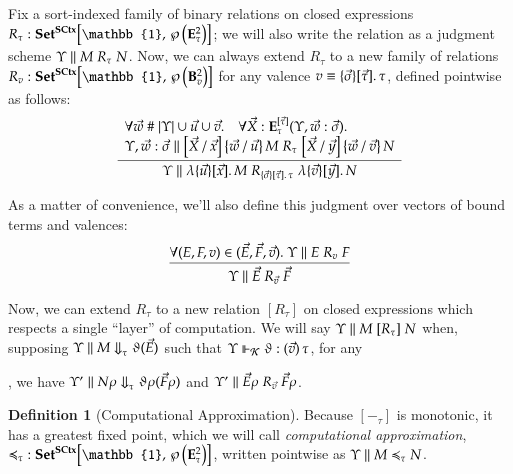 \documentclass[11pt]{article}
\theoremstyle{definition}
\newtheorem{definition}[thm]{Definition}
\theoremstyle{remark}
\numberwithin{equation}{section}
\def\IModeColorName{MidnightBlue}
\def\OModeColorName{Maroon}
\def\IModeColorName{Black}
\def\OModeColorName{Black}
\newcommand\IMode[1]{{\color{\IModeColorName}{#1}}}
\newcommand\OMode[1]{{\color{\OModeColorName}{#1}}}
\newcommand\Member[2]{\IMode{#1}\in\IMode{#2}}
\newcommand\Of[2]{\IMode{#1}: \IMode{#2}}
\newcommand\MkValence[3]{%
  \ifthenelse{\equal{#1}{}}{}{%
    \{#1\}%
  }%
  \ifthenelse{\equal{#2}{}}{}{%
    [#2]%
  }.\, #3%
}
\newcommand\MkBTm[3]{\mathbb{\lambda}\{#1\}[#2].\, #3}
\newcommand\MkArity[2]{(#1)\, #2}
\newcommand\Match[2]{\IMode{#1}\equiv\OMode{#2}}
\newcommand\CanOperators{\mathcal{K}}
\newcommand\Sets{\mathbf{Set}}
\newcommand\SCtx{\mathbf{SCtx}}
\newcommand\App[2]{#1(#2)}
\newcommand\Dom[1]{\left\vert#1\right\vert}
\newcommand\Hom[3]{#1\!\left[#2,\,#3\right]}
\newcommand\Rename[3]{%
  \left\{#1\, /\, #2\right\}#3%
}
\newcommand\Subst[3]{%
  \left[#1\, /\, #2\right]#3%
}
\newcommand\Pow[1]{\wp\left(#1\right)}
\newcommand\EvalN[5]{\IMode{#1}\parallel\IMode{#4}\Downarrow^{\OMode{#3}}_{\IMode{#2}}\OMode{#5}}
\newcommand\Eval[4]{\EvalN{#1}{#2}{}{#3}{#4}}
\newcommand\Exprs{\mathbf{E}}
\newcommand\BTms{\mathbf{B}}
\begin{document}
\newcommand\SBinRel[4]{\IMode{#2}\parallel\IMode{#3}\mathrel{#1}\IMode{#4}}

Fix a sort-indexed family of binary relations on closed expressions
$\Of{R_\tau}{\Hom{\Sets^{\SCtx}}{\mathbb{1}}{\Pow{\Exprs_\tau^2}}}$; we will
also write the relation as a judgment scheme
$\SBinRel{R_\tau}{\Upsilon}{M}{N}$. Now, we can always extend $R_\tau$ to a new
family of relations
$\Of{R_v}{\Hom{\Sets^{\SCtx}}{\mathbb{1}}{\Pow{\BTms_v^2}}}$ for any valence
$\Match{v}{\MkValence{\vec{\sigma}}{\vec{\tau}}{\tau}}$, defined pointwise as
follows:
\[
  \infer{
    \SBinRel{R_{\MkValence{\vec{\sigma}}{\vec{\tau}}{\tau}}}{\Upsilon}{
      \MkBTm{\vec{u}}{\vec{x}}{M}
    }{
      \MkBTm{\vec{v}}{\vec{y}}{N}
    }
  }{
    \begin{array}{l}
      \forall\IMode{\vec{w}}\mathrel{\#}\IMode{\Dom{\Upsilon}\cup\vec{u}\cup\vec{v}}.\quad
      \forall\Of{\vec{X}}{\Exprs_\tau^{[\vec{\tau}]}(\Upsilon,\vec{w}:\vec{\sigma})}.\\
      \SBinRel{R_\tau}{\Upsilon,\vec{w}:\vec{\sigma}}{
        \Subst{\vec{X}}{\vec{x}}{\Rename{\vec{w}}{\vec{u}}{M}}
      }{
        \Subst{\vec{X}}{\vec{y}}{\Rename{\vec{w}}{\vec{v}}{N}}
      }
    \end{array}
  }
\]

As a matter of convenience, we'll also define this judgment over vectors of bound terms and valences:
\[
  \infer{
    \SBinRel{R_{\vec{v}}}{\Upsilon}{\vec{E}}{\vec{F}}
  }{
    \forall\Member{(E,F,v)}{(\vec{E},\vec{F},\vec{v})}.\
    \SBinRel{R_v}{\Upsilon}{E}{F}
  }
\]

Now, we can extend $R_\tau$ to a new relation $[R_\tau]$ on closed expressions
which respects a single ``layer'' of computation. We will say
$\SBinRel{[R_\tau]}{\Upsilon}{M}{N}$ when, supposing
$\Eval{\Upsilon}{\tau}{M}{\App{\vartheta}{\Vec{E}}}$ such that
$\IMode{\Upsilon}\Vdash_{\IMode{\CanOperators}}\IMode{\vartheta}:\OMode{\MkArity{\vec{v}}{\tau}}$,
for any
,
we have $\Eval{\Upsilon'}{\tau}{N\rho}{\App{\vartheta\rho}{\Vec{F}\rho}}$ and
$\SBinRel{R_{\vec{v}}}{\Upsilon'}{\vec{E}\rho}{\vec{F}\rho}$.

\begin{definition}[Computational Approximation]
Because $[-_\tau]$ is monotonic, it has a greatest fixed point, which we will
call \emph{computational approximation},
$\Of{\preccurlyeq_\tau}{\Hom{\Sets^\SCtx}{\mathbb{1}}{\Pow{\Exprs_\tau^2}}}$,
written pointwise as $\SBinRel{\preccurlyeq_\tau}{\Upsilon}{M}{N}$.
\end{definition}
\end{document}
